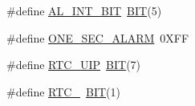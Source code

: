 \begin{DoxyCompactItemize}
\item 
\#define \mbox{\hyperlink{group__rtc_ga466357a0dc78427d5a506eb5c59055c4}{A\+L\+\_\+\+I\+N\+T\+\_\+\+B\+IT}}~\mbox{\hyperlink{group__uart_ga3a8ea58898cb58fc96013383d39f482c}{B\+IT}}(5)
\item 
\#define \mbox{\hyperlink{group__rtc_gaa161c593246e7e56a1b7aa3bc48e8987}{O\+N\+E\+\_\+\+S\+E\+C\+\_\+\+A\+L\+A\+RM}}~0\+X\+FF
\item 
\#define \mbox{\hyperlink{group__rtc_ga2ebe3d816d8b2e9f1be075554e4135b3}{R\+T\+C\+\_\+\+U\+IP}}~\mbox{\hyperlink{group__uart_ga3a8ea58898cb58fc96013383d39f482c}{B\+IT}}(7)
\item 
\#define \mbox{\hyperlink{group__rtc_ga16cc2a9a9cac175d812da04451f7972a}{R\+T\+C\+\_}}~\mbox{\hyperlink{group__uart_ga3a8ea58898cb58fc96013383d39f482c}{B\+IT}}(1)
\end{DoxyCompactItemize}
